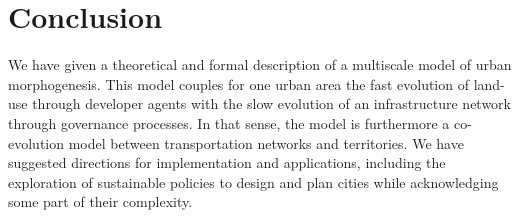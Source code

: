 \documentclass[letterpaper]{article}
\begin{document}
\section{Conclusion}

We have given a theoretical and formal description of a multiscale model of urban morphogenesis. This model couples for one urban area the fast evolution of land-use through developer agents with the slow evolution of an infrastructure network through governance processes. In that sense, the model is furthermore a co-evolution model between transportation networks and territories. We have suggested directions for implementation and applications, including the exploration of sustainable policies to design and plan cities while acknowledging some part of their complexity.





%


\footnotesize
%
\end{document}
